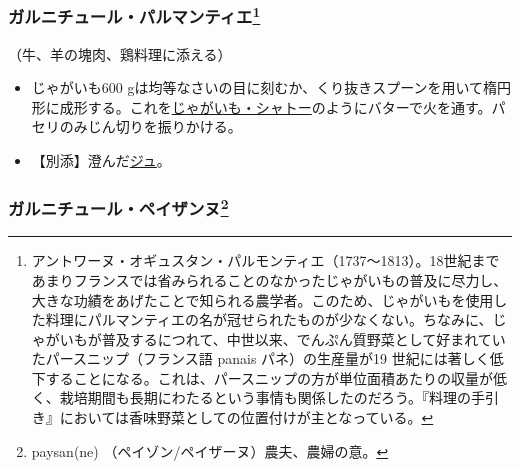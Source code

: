 \begin{recette}
\atoaki{}

\hypertarget{garniture-parmentier}{%
\subsubsection[ガルニチュール・パルマンティエ]{\texorpdfstring{ガルニチュール・パルマンティエ\footnote{アントワーヌ・オギュスタン・パルモンティエ（1737〜1813）。18世紀まであまりフランスでは省みられることのなかったじゃがいもの普及に尽力し、大きな功績をあげたことで知られる農学者。このため、じゃがいもを使用した料理にパルマンティエの名が冠せられたものが少なくない。ちなみに、じゃがいもが普及するにつれて、中世以来、でんぷん質野菜として好まれていたパースニップ（フランス語
  panais パネ）の生産量が19
  世紀には著しく低下することになる。これは、パースニップの方が単位面積あたりの収量が低く、栽培期間も長期にわたるという事情も関係したのだろう。『料理の手引き』においては香味野菜としての位置付けが主となっている。}}{ガルニチュール・パルマンティエ}}\label{garniture-parmentier}}



（牛、羊の塊肉、鶏料理に添える）

\begin{itemize}
\item
  じゃがいも600
  gは均等なさいの目に刻むか、くり抜きスプーンを用いて楕円形に成形する。これを\protect\hyperlink{pommes-de-terre-chateau}{じゃがいも・シャトー}のようにバターで火を通す。パセリのみじん切りを振りかける。
\item
  【別添】澄んだ\protect\hyperlink{jus-de-veau-lie}{ジュ}。
\end{itemize}

\atoaki{}

\hypertarget{garniture-payasanne}{%
\subsubsection[ガルニチュール・ペイザンヌ]{\texorpdfstring{ガルニチュール・ペイザンヌ\footnote{paysan(ne)
  （ペイゾン/ペイザーヌ）農夫、農婦の意。}}{ガルニチュール・ペイザンヌ}}\label{garniture-payasanne}}




\end{recette}
